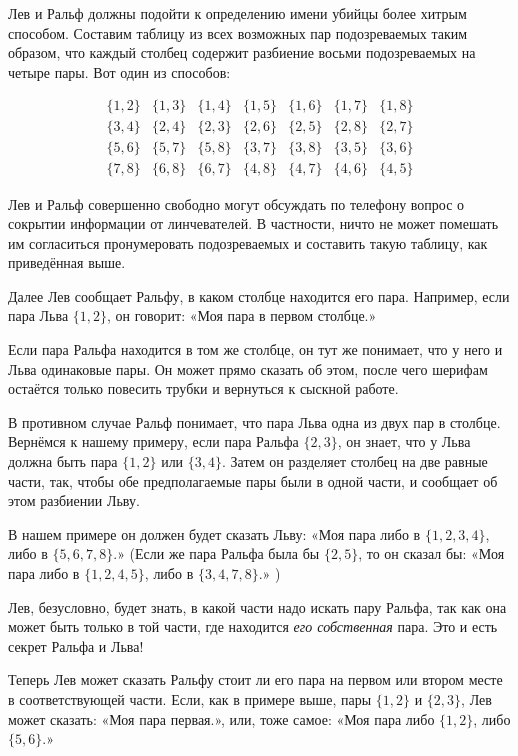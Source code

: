 Лев и Ральф должны подойти к определению имени убийцы более хитрым способом.
Составим таблицу из всех возможных пар подозреваемых таким образом, что каждый столбец содержит разбиение восьми подозреваемых на четыре пары.
Вот один из способов:

\[
\begin{matrix}
\{1,2\}&\{1,3\}&\{1,4\}&\{1,5\}&\{1,6\}&\{1,7\}&\{1,8\}
\\
\{3,4\}&\{2,4\}&\{2,3\}&\{2,6\}&\{2,5\}&\{2,8\}&\{2,7\}
\\
\{5,6\}&\{5,7\}&\{5,8\}&\{3,7\}&\{3,8\}&\{3,5\}&\{3,6\}
\\
\{7,8\}&\{6,8\}&\{6,7\}&\{4,8\}&\{4,7\}&\{4,6\}&\{4,5\}
\end{matrix}
\]


Лев и Ральф совершенно свободно могут обсуждать по телефону вопрос о сокрытии информации от линчевателей.
В частности, ничто не может помешать им согласиться пронумеровать подозреваемых и составить такую таблицу, как приведённая выше.

Далее Лев сообщает Ральфу, в каком столбце находится его пара.
Например, если пара Льва $\{1,2\}$, он говорит: «Моя пара в первом столбце.» 

Если пара Ральфа находится в том же столбце, он тут же понимает, что у него и Льва одинаковые пары.
Он может прямо сказать об этом, после чего шерифам остаётся только повесить трубки и вернуться к сыскной работе.

В противном случае Ральф понимает, что пара Льва одна из двух пар в столбце.
Вернёмся к нашему примеру, если пара Ральфа $\{2,3\}$, он знает, что у Льва должна быть пара $\{1,2\}$ или $\{3,4\}$.
Затем он разделяет столбец на две равные части, так, чтобы обе предполагаемые пары были в одной части, и сообщает об этом разбиении Льву.

В нашем примере он должен будет сказать Льву: «Моя пара либо в $\{1,2,3,4\}$, либо в $\{5,6,7,8\}$.» (Если же пара Ральфа была бы $\{2,5\}$, то он сказал бы: «Моя пара либо в $\{1,2,4,5\}$, либо в $\{3,4,7,8\}$.» )

Лев, безусловно, будет знать, в какой части надо искать пару Ральфа, так как она может быть только в той части, где находится \emph{его собственная} пара.
Это и есть секрет Ральфа и Льва!

Теперь Лев может сказать Ральфу стоит ли его пара на первом или втором месте в соответствующей части.
Если, как в примере выше, пары $\{1,2\}$ и $\{2,3\}$, Лев может сказать: «Моя пара первая.», или, тоже самое: «Моя пара либо $\{1,2\}$, либо $\{5,6\}$.»

